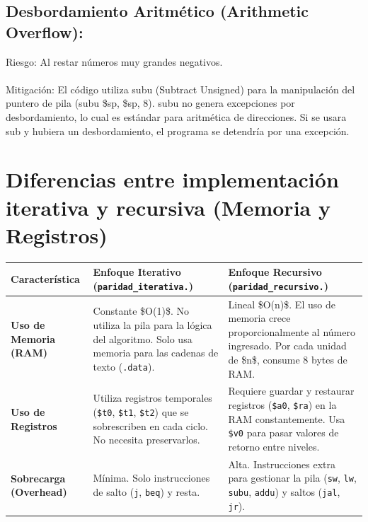 \documentclass{article}
\begin{document}
\subsection{Desbordamiento Aritmético (Arithmetic Overflow):}
Riesgo: Al restar números muy grandes negativos.
\\
\\
Mitigación: El código utiliza subu (Subtract Unsigned) para la manipulación del puntero de pila (subu \$sp, \$sp, 8). subu no genera excepciones por desbordamiento, lo cual es estándar para aritmética de direcciones. Si se usara sub y hubiera un desbordamiento, el programa se detendría por una excepción.

\section{Diferencias entre implementación iterativa y recursiva (Memoria y Registros)}

\begin{table}[h!]
    \centering
    \renewcommand{\arraystretch}{1.5} 
    \begin{tabularx}{\textwidth}{@{} l X X @{}} 
        \toprule
        \textbf{Característica} & \textbf{Enfoque Iterativo} \newline (\texttt{paridad\_iterativa.}) & \textbf{Enfoque Recursivo} \newline (\texttt{paridad\_recursivo.}) \\ 
        \midrule
        
        \textbf{Uso de Memoria (RAM)} & 
        Constante \$O(1)\$. No utiliza la pila para la lógica del algoritmo. Solo usa memoria para las cadenas de texto (\texttt{.data}). & 
        Lineal \$O(n)\$. El uso de memoria crece proporcionalmente al número ingresado. Por cada unidad de \$n\$, consume 8 bytes de RAM. \\ 
        \midrule
        
        \textbf{Uso de Registros} & 
        Utiliza registros temporales (\texttt{\$t0}, \texttt{\$t1}, \texttt{\$t2}) que se sobrescriben en cada ciclo. No necesita preservarlos. & 
        Requiere guardar y restaurar registros (\texttt{\$a0}, \texttt{\$ra}) en la RAM constantemente. Usa \texttt{\$v0} para pasar valores de retorno entre niveles. \\ 
        \midrule
        
        \textbf{Sobrecarga (Overhead)} & 
        Mínima. Solo instrucciones de salto (\texttt{j}, \texttt{beq}) y resta. & 
        Alta. Instrucciones extra para gestionar la pila (\texttt{sw}, \texttt{lw}, \texttt{subu}, \texttt{addu}) y saltos (\texttt{jal}, \texttt{jr}). \\ 
        \bottomrule
    \end{tabularx}
    \label{tab:comparacion-mips}
\end{table}
\end{document}

